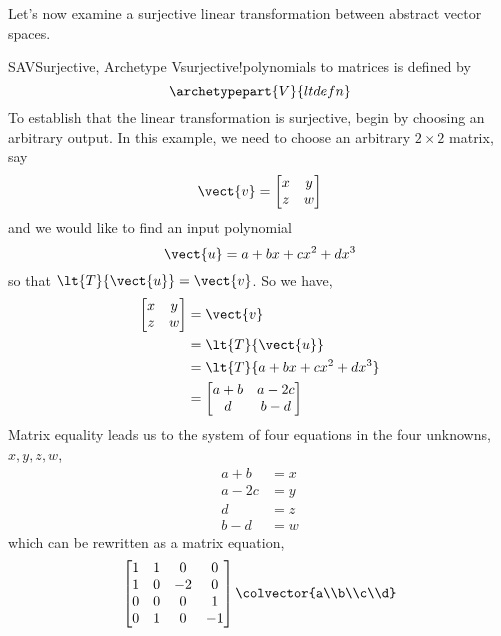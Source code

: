 %
Let's now examine a surjective linear transformation between abstract vector spaces.
%
\begin{example}{SAV}{Surjective, Archetype V}{surjective!polynomials to matrices}
 is defined by
%
\begin{equation*}
\archetypepart{V}{ltdefn}
\end{equation*}
%
To establish that the linear transformation is surjective, begin by choosing an arbitrary output.  In this example, we need to choose an arbitrary $2\times 2$ matrix, say
%
\begin{equation*}
\vect{v}=\begin{bmatrix}x&y\\z&w\end{bmatrix}
\end{equation*}
%
and we would like to find an input polynomial
%
\begin{equation*}
\vect{u}=a+bx+cx^2+dx^3
\end{equation*}
%
so that $\lt{T}{\vect{u}}=\vect{v}$.  So we have,
%
\begin{align*}
\begin{bmatrix}x&y\\z&w\end{bmatrix}&=\vect{v}\\
&=\lt{T}{\vect{u}}\\
&=\lt{T}{a+bx+cx^2+dx^3}\\
&=\begin{bmatrix}
a+b & a-2c\\
d & b-d
\end{bmatrix}
\end{align*}
%
Matrix equality leads us to the system of four equations in the four unknowns, $x,y,z,w$,
%
\begin{align*}
a+b&=x\\
a-2c&=y\\
d&=z\\
b-d&=w
\end{align*}
%
which can be rewritten as a matrix equation,
%
\begin{equation*}
\begin{bmatrix}
1 & 1 & 0 & 0\\
1 & 0 & -2 & 0 \\
0 & 0 & 0 & 1\\
0 & 1 & 0 & -1
\end{bmatrix}
\colvector{a\\b\\c\\d}

\end{equation*}
\end{example}
